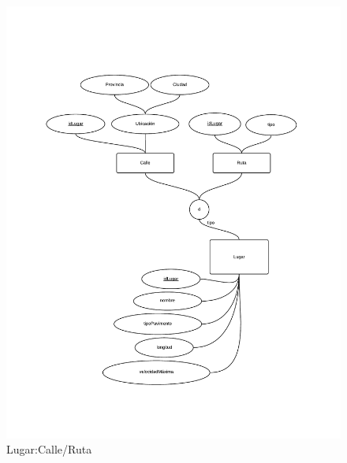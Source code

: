 \newpage
\begin{figure}
  \begin{center}
    \includegraphics[scale=0.6]{diagramas/2-3.pdf}
    \caption{Lugar:Calle/Ruta}
  \end{center}
\end{figure}

